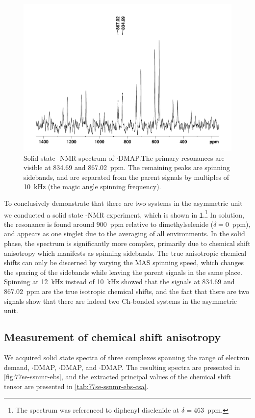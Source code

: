 \begin{refsection}
\begin{figure}
  \centering
  \includegraphics[width=0.7\linewidth]{Figures/ebs-4ome-dmap-cpmas-77se.pdf}
  \caption[Solid state -NMR spectrum of $ \cdot $DMAP.]{Solid state -NMR spectrum of $ \cdot $DMAP.\@ The primary resonances are visible at 834.69 and 867.02~ppm. The remaining peaks are spinning sidebands, and are separated from the parent signals by multiples of 10~kHz (the magic angle spinning frequency).}\label{fig:cpmas-sol-77se}
\end{figure}

To conclusively demonstrate that there are two systems in the asymmetric unit we conducted a solid state -NMR experiment, which is shown in \cref{fig:cpmas-sol-77se}.\footnote{The  spectrum was referenced to diphenyl diselenide at $\delta=463$~ppm.}
In solution, the  resonance is found around 900~ppm relative to dimethylselenide ($\delta=0$~ppm), and appears as one singlet due to the averaging of all environments.
In the solid phase, the spectrum is significantly more complex, primarily due to chemical shift anisotropy which manifests as spinning sidebands.
The true anisotropic chemical shifts can only be discerned by varying the MAS spinning speed, which changes the spacing of the sidebands while leaving the parent signals in the same place.
Spinning at 12~kHz instead of 10~kHz showed that the signals at 834.69 and 867.02~ppm are the true isotropic chemical shifts, and the fact that there are two signals show that there are indeed two Ch-bonded systems in the asymmetric unit.

\subsection{Measurement of chemical shift anisotropy}
We acquired solid state spectra of three complexes spanning the range of electron demand, $ \cdot $DMAP, $ \cdot $DMAP, and $ \cdot $DMAP.\@
The resulting spectra are presented in \cref{fig:77se-ssnmr-ebs}, and the extracted principal values of the chemical shift tensor are presented in \cref{tab:77se-ssnmr-ebs-csa}.


\end{refsection}
